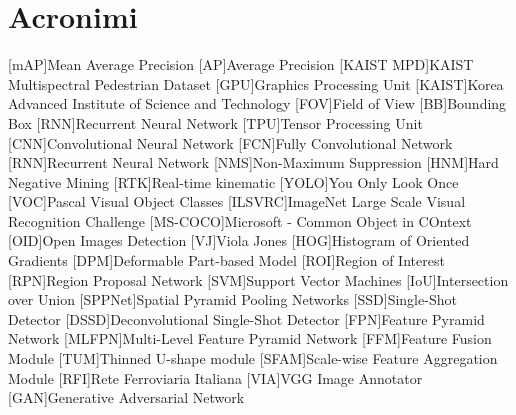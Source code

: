 \chapter*{Acronimi}
\begin{acronym}[CAGD]
    [mAP]{Mean Average Precision}
    [AP]{Average Precision}
    [KAIST MPD]{KAIST Multispectral Pedestrian Dataset}
    [GPU]{Graphics Processing Unit}
    [KAIST]{Korea Advanced Institute of Science and Technology}
    [FOV]{Field of View}
    [BB]{Bounding Box}
    [RNN]{Recurrent Neural Network}
    [TPU]{Tensor Processing Unit}
    [CNN]{Convolutional Neural Network}
    [FCN]{Fully Convolutional Network}
    [RNN]{Recurrent Neural Network}
    [NMS]{Non-Maximum Suppression}
    [HNM]{Hard Negative Mining}
    [RTK]{Real-time kinematic}
    [YOLO]{You Only Look Once}
    [VOC]{Pascal Visual Object Classes}
    [ILSVRC]{ImageNet Large Scale Visual Recognition Challenge}
    [MS-COCO]{Microsoft - Common Object in COntext}
    [OID]{Open Images Detection}
    [VJ]{Viola Jones}
    [HOG]{Histogram of Oriented Gradients}
    [DPM]{Deformable Part-based Model}
    [ROI]{Region of Interest}
    [RPN]{Region Proposal Network}
    [SVM]{Support Vector Machines}
    [IoU]{Intersection over Union}
    [SPPNet]{Spatial Pyramid Pooling Networks}
    [SSD]{Single-Shot Detector}
    [DSSD]{Deconvolutional Single-Shot Detector}
    [FPN]{Feature Pyramid Network}
    [MLFPN]{Multi-Level Feature Pyramid Network}
    [FFM]{Feature Fusion Module}
    [TUM]{Thinned U-shape module}
    [SFAM]{Scale-wise Feature Aggregation Module}
    [RFI]{Rete Ferroviaria Italiana}
    [VIA]{VGG Image Annotator}
    [GAN]{Generative Adversarial Network}
\end{acronym}